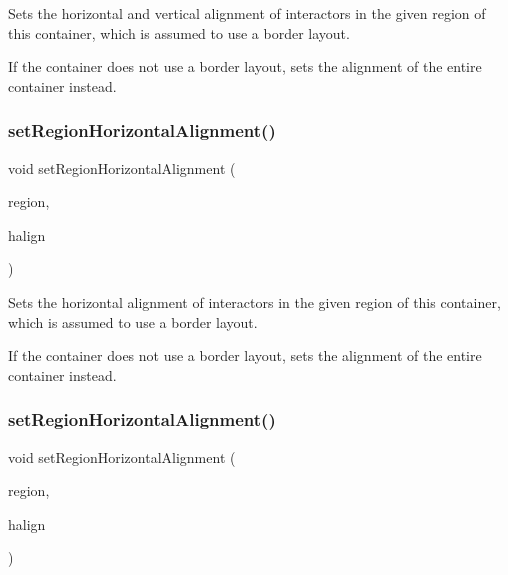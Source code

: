 Sets the horizontal and vertical alignment of interactors in the given region of this container, which is assumed to use a border layout. 

If the container does not use a border layout, sets the alignment of the entire container instead. \mbox{\label{classsgl_1_1GContainer_aca8f01ef261afca9c843589e8be54134}} 
\subsubsection{\texorpdfstring{set\+Region\+Horizontal\+Alignment()}{setRegionHorizontalAlignment()}\hspace{0.1cm}{\footnotesize\ttfamily [1/2]}}
{\footnotesize\ttfamily void set\+Region\+Horizontal\+Alignment (\begin{DoxyParamCaption}\item[{\mbox{\hyperlink{classsgl_1_1GContainer_a81a01a86de31071a92e6cce0bab9bc4b}{Region}}}]{region,  }\item[{\mbox{\hyperlink{namespacesgl_aa00e70829e72ff16addc4d9f06fe3bc5}{Horizontal\+Alignment}}}]{halign }\end{DoxyParamCaption})\hspace{0.3cm}{\ttfamily [virtual]}}



Sets the horizontal alignment of interactors in the given region of this container, which is assumed to use a border layout. 

If the container does not use a border layout, sets the alignment of the entire container instead. \mbox{\label{classsgl_1_1GContainer_aefb97090ff4e149f8a0cce9efee3c451}} 
\subsubsection{\texorpdfstring{set\+Region\+Horizontal\+Alignment()}{setRegionHorizontalAlignment()}\hspace{0.1cm}{\footnotesize\ttfamily [2/2]}}
{\footnotesize\ttfamily void set\+Region\+Horizontal\+Alignment (\begin{DoxyParamCaption}\item[{const std\+::string \&}]{region,  }\item[{const std\+::string \&}]{halign }\end{DoxyParamCaption})\hspace{0.3cm}{\ttfamily [virtual]}}



